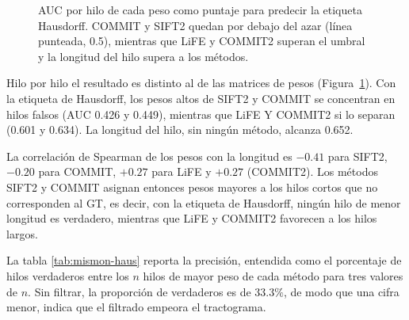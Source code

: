 \documentclass[11pt,a4paper]{article}
\begin{document}
\begin{figure}[H]
\centering
{}
\caption{AUC por hilo de cada peso como puntaje para predecir la etiqueta Hausdorff.
COMMIT y SIFT2 quedan por debajo del azar (l\'inea punteada, 0.5), mientras que LiFE y COMMIT2
superan el umbral y la longitud del hilo supera a los m\'etodos.}
\label{fig:auc}
\end{figure}

Hilo por hilo el resultado es distinto al de las matrices  de pesos (Figura~\ref{fig:auc}). Con la etiqueta de Hausdorff, los
pesos altos de SIFT2 y COMMIT se concentran en hilos falsos (AUC 0.426 y 0.449), mientras que
LiFE Y COMMIT2 si lo separan (0.601 y 0.634). La longitud del hilo, sin ningún método, alcanza 0.652.


La correlación de
Spearman de los pesos con la longitud es $-0.41$ para SIFT2, $-0.20$ para COMMIT, $+0.27$ para LiFE y $+0.27$ (COMMIT2). Los métodos SIFT2 y COMMIT asignan entonces pesos mayores a los hilos cortos que no corresponden al GT, es decir, con la etiqueta de Hausdorff, ningún hilo de menor longitud es verdadero, mientras que LiFE y COMMIT2 favorecen a los hilos largos. 


La tabla \ref{tab:mismon-haus} reporta la precisión, entendida como el porcentaje de hilos verdaderos entre los $n$ hilos de mayor peso de cada método para tres valores de $n$. Sin filtrar, la proporción de verdaderos es de $33.3\%$, de modo que una cifra menor, indica que el filtrado empeora el tractograma. 
\end{document}
